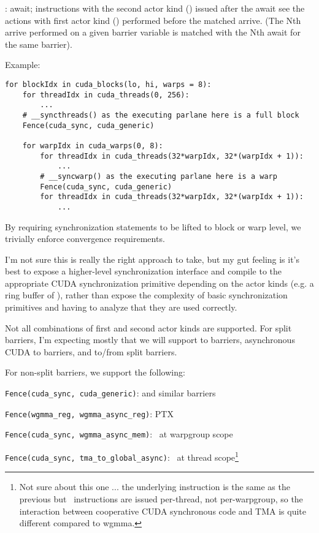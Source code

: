 : await; instructions with the second actor kind () issued after the await see the actions with first actor kind () performed before the matched arrive.
(The Nth arrive performed on a given barrier variable is matched with the Nth await for the same barrier).

\filbreak
Example:

{\color{lightttColor}
\begin{verbatim}
for blockIdx in cuda_blocks(lo, hi, warps = 8):
    for threadIdx in cuda_threads(0, 256):
        ...
    # __syncthreads() as the executing parlane here is a full block
    Fence(cuda_sync, cuda_generic)

    for warpIdx in cuda_warps(0, 8):
        for threadIdx in cuda_threads(32*warpIdx, 32*(warpIdx + 1)):
            ...
        # __syncwarp() as the executing parlane here is a warp
        Fence(cuda_sync, cuda_generic)
        for threadIdx in cuda_threads(32*warpIdx, 32*(warpIdx + 1)):
            ...
\end{verbatim}
}

By requiring synchronization statements to be lifted to block or warp level, we trivially enforce convergence requirements.

\filbreak
I'm not sure this is really the right approach to take, but my gut feeling is it's best to expose a higher-level synchronization interface and compile to the appropriate CUDA synchronization primitive depending on the actor kinds (e.g. a ring buffer of \mbarrier), rather than expose the complexity of basic synchronization primitives and having to analyze that they are used correctly.

\filbreak
Not all combinations of first and second actor kinds are supported.
For split barriers, I'm expecting mostly that we will support  to  barriers, asynchronous CUDA to  barriers, and  to/from  split barriers.

\filbreak
For non-split barriers, we support the following:

\texttt{Fence(cuda\_sync, cuda\_generic)}:  and similar barriers

\texttt{Fence(wgmma\_reg, wgmma\_async\_reg)}: PTX \wgmmaFence

\texttt{Fence(cuda\_sync, wgmma\_async\_mem)}: \fenceProxyAsync\ at warpgroup scope

\texttt{Fence(cuda\_sync, tma\_to\_global\_async)}: \fenceProxyAsync\ at thread scope\footnote{Not sure about this one ... the underlying instruction is the same as the previous but \cpAsyncBulk\ instructions are issued per-thread, not per-warpgroup, so the interaction between cooperative CUDA synchronous code and TMA is quite different compared to wgmma.}

